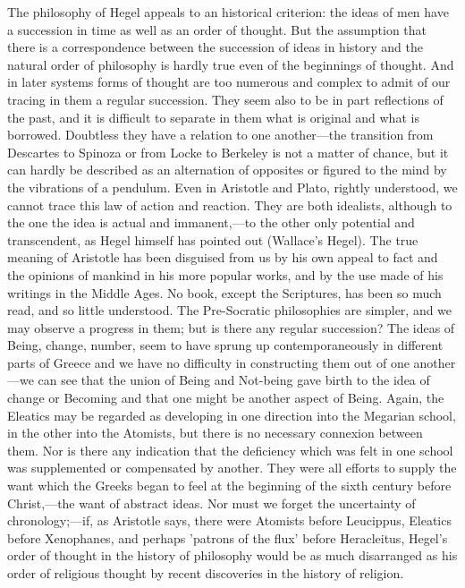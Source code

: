 \documentclass[11pt,letter]{article}
\begin{document}
\par  The philosophy of Hegel appeals to an historical criterion: the ideas of men have a succession in time as well as an order of thought. But the assumption that there is a correspondence between the succession of ideas in history and the natural order of philosophy is hardly true even of the beginnings of thought. And in later systems forms of thought are too numerous and complex to admit of our tracing in them a regular succession. They seem also to be in part reflections of the past, and it is difficult to separate in them what is original and what is borrowed. Doubtless they have a relation to one another—the transition from Descartes to Spinoza or from Locke to Berkeley is not a matter of chance, but it can hardly be described as an alternation of opposites or figured to the mind by the vibrations of a pendulum. Even in Aristotle and Plato, rightly understood, we cannot trace this law of action and reaction. They are both idealists, although to the one the idea is actual and immanent,—to the other only potential and transcendent, as Hegel himself has pointed out (Wallace's Hegel). The true meaning of Aristotle has been disguised from us by his own appeal to fact and the opinions of mankind in his more popular works, and by the use made of his writings in the Middle Ages. No book, except the Scriptures, has been so much read, and so little understood. The Pre-Socratic philosophies are simpler, and we may observe a progress in them; but is there any regular succession? The ideas of Being, change, number, seem to have sprung up contemporaneously in different parts of Greece and we have no difficulty in constructing them out of one another—we can see that the union of Being and Not-being gave birth to the idea of change or Becoming and that one might be another aspect of Being. Again, the Eleatics may be regarded as developing in one direction into the Megarian school, in the other into the Atomists, but there is no necessary connexion between them. Nor is there any indication that the deficiency which was felt in one school was supplemented or compensated by another. They were all efforts to supply the want which the Greeks began to feel at the beginning of the sixth century before Christ,—the want of abstract ideas. Nor must we forget the uncertainty of chronology;—if, as Aristotle says, there were Atomists before Leucippus, Eleatics before Xenophanes, and perhaps 'patrons of the flux' before Heracleitus, Hegel's order of thought in the history of philosophy would be as much disarranged as his order of religious thought by recent discoveries in the history of religion.
\end{document}
